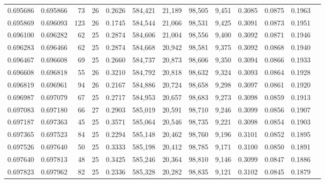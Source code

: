 \begin{tabular}{rrrrrrrrrrrrr}
0.695686 & 0.695866 &  73 &  26 &                                     0.2626 & 584,421 &  21,189 &  98,505 &   9,451 & 0.3085 & 0.0875 & 0.1963 \\
0.695869 & 0.696093 & 123 &  26 &                                     0.1745 & 584,544 &  21,066 &  98,531 &   9,425 & 0.3091 & 0.0873 & 0.1951 \\
0.696100 & 0.696282 &  62 &  25 &                                     0.2874 & 584,606 &  21,004 &  98,556 &   9,400 & 0.3092 & 0.0871 & 0.1946 \\
0.696283 & 0.696466 &  62 &  25 &                                     0.2874 & 584,668 &  20,942 &  98,581 &   9,375 & 0.3092 & 0.0868 & 0.1940 \\
0.696467 & 0.696608 &  69 &  25 &                                     0.2660 & 584,737 &  20,873 &  98,606 &   9,350 & 0.3094 & 0.0866 & 0.1933 \\
0.696608 & 0.696818 &  55 &  26 &                                     0.3210 & 584,792 &  20,818 &  98,632 &   9,324 & 0.3093 & 0.0864 & 0.1928 \\
0.696819 & 0.696961 &  94 &  26 &                                     0.2167 & 584,886 &  20,724 &  98,658 &   9,298 & 0.3097 & 0.0861 & 0.1920 \\
0.696987 & 0.697079 &  67 &  25 &                                     0.2717 & 584,953 &  20,657 &  98,683 &   9,273 & 0.3098 & 0.0859 & 0.1913 \\
0.697083 & 0.697180 &  66 &  27 &                                     0.2903 & 585,019 &  20,591 &  98,710 &   9,246 & 0.3099 & 0.0856 & 0.1907 \\
0.697187 & 0.697363 &  45 &  25 &                                     0.3571 & 585,064 &  20,546 &  98,735 &   9,221 & 0.3098 & 0.0854 & 0.1903 \\
0.697365 & 0.697523 &  84 &  25 &                                     0.2294 & 585,148 &  20,462 &  98,760 &   9,196 & 0.3101 & 0.0852 & 0.1895 \\
0.697526 & 0.697640 &  50 &  25 &                                     0.3333 & 585,198 &  20,412 &  98,785 &   9,171 & 0.3100 & 0.0850 & 0.1891 \\
0.697640 & 0.697813 &  48 &  25 &                                     0.3425 & 585,246 &  20,364 &  98,810 &   9,146 & 0.3099 & 0.0847 & 0.1886 \\
0.697823 & 0.697962 &  82 &  25 &                                     0.2336 & 585,328 &  20,282 &  98,835 &   9,121 & 0.3102 & 0.0845 & 0.1879 \\

\end{tabular}
